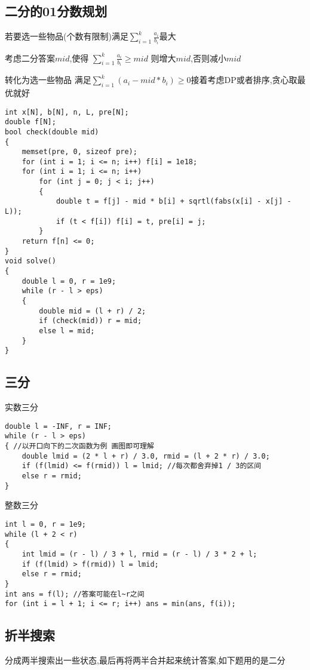 \documentclass[a4paper,fontset=none]{ctexart}
\begin{document}
\subsection{二分的01分数规划}

若要选一些物品(个数有限制)满足$\sum\limits_{i=1}^k\frac{a_i}{b_i}$最大

考虑二分答案$mid$,使得 $\sum\limits_{i=1}^k\frac{a_i}{b_i}\ge mid$ 则增大$mid$,否则减小$mid$

转化为选一些物品 满足$\sum\limits_{i=1}^k(a_i-mid*b_i)\ge0$接着考虑DP或者排序,贪心取最优就好

\begin{verbatim}
int x[N], b[N], n, L, pre[N];
double f[N];
bool check(double mid)
{
    memset(pre, 0, sizeof pre);
    for (int i = 1; i <= n; i++) f[i] = 1e18;
    for (int i = 1; i <= n; i++)
        for (int j = 0; j < i; j++)
        {
            double t = f[j] - mid * b[i] + sqrtl(fabs(x[i] - x[j] - L));
            if (t < f[i]) f[i] = t, pre[i] = j;
        }
    return f[n] <= 0;
}
void solve()
{
    double l = 0, r = 1e9;
    while (r - l > eps)
    {
        double mid = (l + r) / 2;
        if (check(mid)) r = mid;
        else l = mid;
    }
}
\end{verbatim}
\subsection{三分}

实数三分

\begin{verbatim}
double l = -INF, r = INF;
while (r - l > eps)
{ //以开口向下的二次函数为例 画图即可理解
    double lmid = (2 * l + r) / 3.0, rmid = (l + 2 * r) / 3.0;
    if (f(lmid) <= f(rmid)) l = lmid; //每次都舍弃掉1 / 3的区间
    else r = rmid;
}
\end{verbatim}

整数三分

\begin{verbatim}
int l = 0, r = 1e9;
while (l + 2 < r)
{
    int lmid = (r - l) / 3 + l, rmid = (r - l) / 3 * 2 + l;
    if (f(lmid) > f(rmid)) l = lmid;
    else r = rmid;
}
int ans = f(l); //答案可能在l~r之间
for (int i = l + 1; i <= r; i++) ans = min(ans, f(i));
\end{verbatim}
\subsection{折半搜索}

分成两半搜索出一些状态,最后再将两半合并起来统计答案,如下题用的是二分
\end{document}
